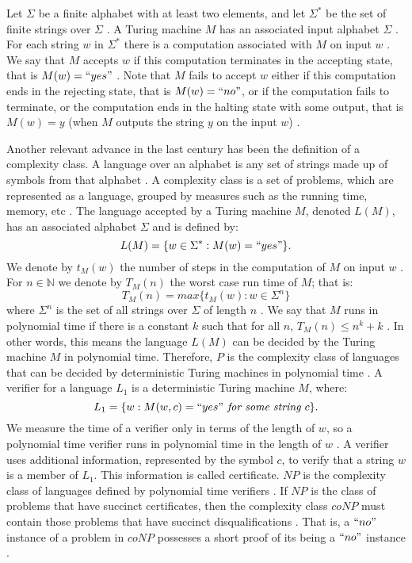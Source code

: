 \documentclass[a4paper,UKenglish,cleveref, autoref]{lipics-v2019}
\begin{document}
Let $\Sigma$ be a finite alphabet with at least two elements, and let $\Sigma^{*}$ be the set of finite strings over $\Sigma$ \cite{AB09}. A Turing machine $M$ has an associated input alphabet $\Sigma$ \cite{AB09}. For each string $w$ in $\Sigma^{*}$ there is a computation associated with $M$ on input $w$ \cite{AB09}. We say that $M$ accepts $w$ if this computation terminates in the accepting state, that is $M(w)=``yes"$ \cite{AB09}. Note that $M$ fails to accept $w$ either if this computation ends in the rejecting state, that is $M(w)=``no"$, or if the computation fails to terminate, or the computation ends in the halting state with some output, that is $M(w)=y$ (when $M$ outputs the string $y$ on the input $w$) \cite{AB09}.

Another relevant advance in the last century has been the definition of a complexity class. A language over an alphabet is any set of strings made up of symbols from that alphabet \cite{CLRS01}. A complexity class is a set of problems, which are represented as a language, grouped by measures such as the running time, memory, etc \cite{CLRS01}. The language accepted by a Turing machine $M$, denoted $L(M)$, has an associated alphabet $\Sigma$ and is defined by:
\[L(M) = \{w \in \Sigma^{*}: M(w)=``yes" \}.\]
We denote by $t_{M}(w)$ the number of steps in the computation of $M$ on input $w$ \cite{AB09}. For $n \in \mathbb{N}$ we denote by $T_{M}(n)$ the worst case run time of $M$; that is:
\[T_{M}(n) = max\{t_{M}(w): w \in \Sigma^{n} \}\]
where $\Sigma^{n}$ is the set of all strings over $\Sigma$ of length $n$ \cite{AB09}. We say that $M$ runs in polynomial time if there is a constant $k$ such that for all $n$, $T_{M}(n) \leq n^{k} + k$ \cite{AB09}. In other words, this means the language $L(M)$ can be decided by the Turing machine $M$ in polynomial time. Therefore, $P$ is the complexity class of languages that can be decided by deterministic Turing machines in polynomial time \cite{CLRS01}. A verifier for a language $L_{1}$ is a deterministic Turing machine $M$, where:
\[L_{1} = \{w: M(w, c) = ``yes" \textit{ for some string } c\}.\]
We measure the time of a verifier only in terms of the length of $w$, so a polynomial time verifier runs in polynomial time in the length of $w$ \cite{AB09}. A verifier uses additional information, represented by the symbol $c$, to verify that a string $w$ is a member of $L_{1}$. This information is called certificate. $NP$ is the complexity class of languages defined by polynomial time verifiers \cite{Pap03}. If $NP$ is the class of problems that have succinct certificates, then the complexity class $coNP$ must contain those problems that have succinct disqualifications \cite{Pap03}. That is, a $``no"$ instance of a problem in $coNP$ possesses a short proof of its being a $``no"$ instance \cite{Pap03}.
\end{document}
